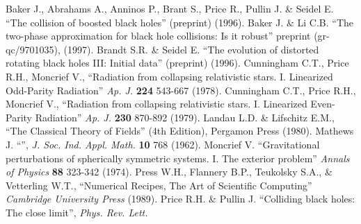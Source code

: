 \documentclass{article}
\begin{document}
\begin{thebibliography}{9}
       Baker J., Abrahams A., Anninos P., Brant S., 
                          Price R., Pullin J. \& Seidel E. 
                        ``The collision of boosted black holes'' 
                        (preprint) 
                        (1996).
       Baker J. \& Li C.B.
                        ``The two-phase approximation for black hole 
                          collisions: Is it robust''
                        preprint (gr-qc/9701035),
                        (1997).
      Brandt S.R. \& Seidel E. 
                        ``The evolution of distorted rotating black holes III:
                          Initial data'' 
                        (preprint) 
                        (1996).
  Cunningham C.T., Price R.H., Moncrief V.,
                        ``Radiation from collapsing 
                          relativistic stars. 
                          I. Linearized Odd-Parity Radiation''
                        {\em Ap. J.}
                        {\bf 224}
                        543-667
                        (1978).
  Cunningham C.T., Price R.H., Moncrief V.,
                        ``Radiation from collapsing 
                          relativistic stars. 
                          I. Linearized Even-Parity Radiation''
                        {\em Ap. J.}
                        {\bf 230}
                        870-892
                        (1979).
      Landau L.D. \& Lifschitz E.M.,
                        ``The Classical Theory of Fields''
                        (4th Edition),
                        Pergamon Press
                        (1980).
       Mathews J. ``'', 
                        {\em J. Soc. Ind. Appl. Math.} 
                        {\bf 10}
                        768 
                        (1962).
    Moncrief V. ``Gravitational perturbations of spherically
                        symmetric systems. I. The exterior problem''
                        {\em Annals of Physics} 
                        {\bf 88}
                        323-342 
                        (1974).
        Press W.H., Flannery B.P., Teukolsky S.A., \& Vetterling W.T.,
                        ``Numerical Recipes, The Art of Scientific Computing''
                        {\em Cambridge University Press} 
                        (1989).
       Price R.H. \& Pullin J. 
                        ``Colliding black holes: The close limit'',
                        {\em Phys. Rev. Lett.} 

\end{thebibliography}
\end{document}
